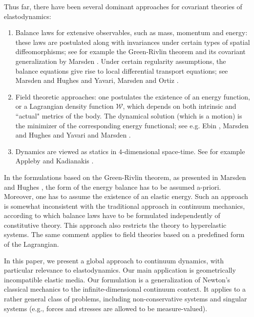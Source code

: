 \documentclass[smallextended]{svjour3}
\begin{document}
Thus far, there have been several dominant approaches for covariant theories of elastodynamics:
\begin{enumerate}

\item Balance laws for extensive observables, such as mass, momentum and energy: these laws 
 are postulated along with invariances under certain types of spatial diffeomorphisms; 
see for example the Green-Rivlin theorem \cite{GR64}  and its covariant generalization by  Marsden \cite{MH83}. 
Under certain regularity assumptions, the balance equations give rise to local differential transport equations; see Marsden and Hughes \cite{MH83} and Yavari, Marsden and Ortiz \cite{YMO06}.  

\item  Field theoretic approaches: one postulates the existence of an energy function, or a Lagrangian density function $\mathcal{W}$, which depends on both intrinsic and ``actual" metrics of the body. The dynamical solution (which is a motion) is the minimizer of the corresponding energy functional; see e.g.  Ebin \cite{Ebi93}, Marsden and Hughes \cite{MH83} and Yavari  and Marsden \cite{YM12}.

\item Dynamics are viewed as statics in $4$-dimensional space-time. See for example Appleby and Kadianakis \cite{AK86}.
\end{enumerate}

In the formulations based on the Green-Rivlin theorem, as presented in Marsden and Hughes \cite{MH83}, the form of the energy balance has to be assumed a-priori. Moreover, one has to assume the existence of an elastic energy. Such an approach is somewhat inconsistent with the traditional approach in continuum mechanics, according to which balance laws have to be formulated independently of constitutive theory. This approach also restricts the theory to hyperelastic systems. The same comment applies to field theories based on a predefined form of the Lagrangian. 

In this paper, we present a global approach to continuum dynamics, with particular relevance to elastodynamics. Our main application is geometrically incompatible elastic media. Our formulation is a generalization of Newton's classical mechanics to the infinite-dimensional continuum context. It applies to a rather general class of problems, including non-conservative systems and singular systems (e.g., forces and stresses are allowed to be measure-valued). 
\end{document}
